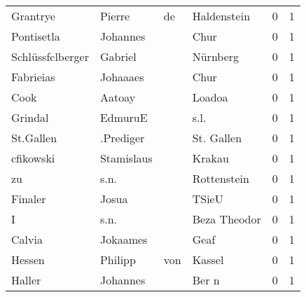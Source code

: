 \documentclass[10pt,a4paper,landscape]{article}
\begin{document}
\begin{longtable}{llllrr}
                 Grantrye &                             Pierre &          de &                                 Haldenstein &          0 &         1 \\
               Pontisetla &                           Johannes &             &                                        Chur &          0 &         1 \\
         Schlüssfclberger &                            Gabriel &             &                                    Nürnberg &          0 &         1 \\
                Fabrieias &                           Johaaaes &             &                                        Chur &          0 &         1 \\
                     Cook &                             Aatoay &             &                                      Loadoa &          0 &         1 \\
                  Grindal &                            EdmuruE &             &                                        s.l. &          0 &         1 \\
                St.Gallen &                          .Prediger &             &                                  St. Gallen &          0 &         1 \\
                cfikowski &                         Stamislaus &             &                                      Krakau &          0 &         1 \\
                       zu &                               s.n. &             &                                 Rottenstein &          0 &         1 \\
                  Finaler &                              Josua &             &                                       TSieU &          0 &         1 \\
                        I &                               s.n. &             &                                Beza Theodor &          0 &         1 \\
                   Calvia &                           Jokaames &             &                                        Geaf &          0 &         1 \\
                   Hessen &                            Philipp &         von &                                      Kassel &          0 &         1 \\
                   Haller &                           Johannes &             &                                       Ber n &          0 &         1 \\

\end{longtable}
\end{document}
